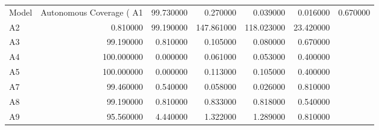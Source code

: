\begin{tabular}{lrrrrr}
\toprule
Model & Autonomous Coverage (%
\midrule
A1 & 99.730000 & 0.270000 & 0.039000 & 0.016000 & 0.670000 \\
A2 & 0.810000 & 99.190000 & 147.861000 & 118.023000 & 23.420000 \\
A3 & 99.190000 & 0.810000 & 0.105000 & 0.080000 & 0.670000 \\
A4 & 100.000000 & 0.000000 & 0.061000 & 0.053000 & 0.400000 \\
A5 & 100.000000 & 0.000000 & 0.113000 & 0.105000 & 0.400000 \\
A7 & 99.460000 & 0.540000 & 0.058000 & 0.026000 & 0.810000 \\
A8 & 99.190000 & 0.810000 & 0.833000 & 0.818000 & 0.540000 \\
A9 & 95.560000 & 4.440000 & 1.322000 & 1.289000 & 0.810000 \\
\bottomrule
\end{tabular}

